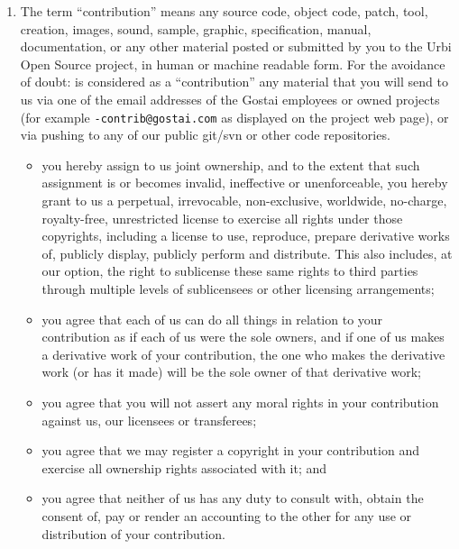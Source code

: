 \begin{enumerate}
\item The term ``contribution'' means any source code, object code, patch,
  tool, creation, images, sound, sample, graphic, specification, manual,
  documentation, or any other material posted or submitted by you to the
  Urbi Open Source project, in human or machine readable form. For the
  avoidance of doubt: is considered as a ``contribution'' any material that
  you will send to us via one of the email addresses of the Gostai employees
  or owned projects (for example \texttt{-contrib@gostai.com}
  as displayed on the project web page), or via pushing to any of our public
  git/svn or other code repositories.

  \begin{itemize}
  \item you hereby assign to us joint ownership, and to the extent that such
    assignment is or becomes invalid, ineffective or unenforceable, you
    hereby grant to us a perpetual, irrevocable, non-exclusive, worldwide,
    no-charge, royalty-free, unrestricted license to exercise all rights
    under those copyrights, including a license to use, reproduce, prepare
    derivative works of, publicly display, publicly perform and
    distribute. This also includes, at our option, the right to sublicense
    these same rights to third parties through multiple levels of
    sublicensees or other licensing arrangements;

  \item you agree that each of us can do all things in relation to your
    contribution as if each of us were the sole owners, and if one of us
    makes a derivative work of your contribution, the one who makes the
    derivative work (or has it made) will be the sole owner of that
    derivative work;

  \item you agree that you will not assert any moral rights in your
    contribution against us, our licensees or transferees;

  \item you agree that we may register a copyright in your contribution and
    exercise all ownership rights associated with it; and

  \item you agree that neither of us has any duty to consult with, obtain
    the consent of, pay or render an accounting to the other for any use or
    distribution of your contribution.
  \end{itemize}


\end{enumerate}
